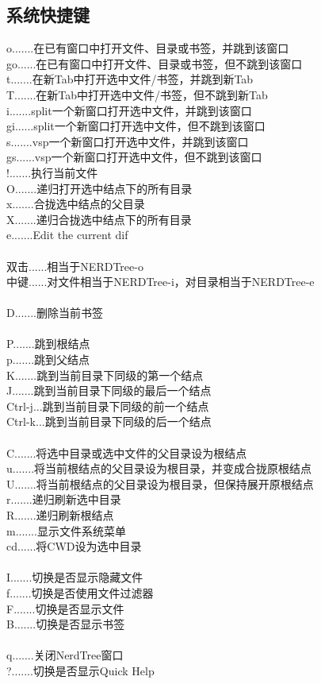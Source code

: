 \subsection{系统快捷键}
o.......在已有窗口中打开文件、目录或书签，并跳到该窗口   \\
go......在已有窗口中打开文件、目录或书签，但不跳到该窗口 \\
t.......在新Tab中打开选中文件/书签，并跳到新Tab          \\
T.......在新Tab中打开选中文件/书签，但不跳到新Tab        \\
i.......split一个新窗口打开选中文件，并跳到该窗口        \\
gi......split一个新窗口打开选中文件，但不跳到该窗口      \\
s.......vsp一个新窗口打开选中文件，并跳到该窗口          \\
gs......vsp一个新窗口打开选中文件，但不跳到该窗口        \\
!.......执行当前文件                                     \\
O.......递归打开选中结点下的所有目录                     \\
x.......合拢选中结点的父目录                             \\
X.......递归合拢选中结点下的所有目录                     \\
e.......Edit the current dif                             \\
\\
双击......相当于NERDTree-o\\
中键......对文件相当于NERDTree-i，对目录相当于NERDTree-e\\
\\
D.......删除当前书签\\
       \\
P.......跳到根结点\\
p.......跳到父结点\\
K.......跳到当前目录下同级的第一个结点\\
J.......跳到当前目录下同级的最后一个结点\\
Ctrl-j...跳到当前目录下同级的前一个结点\\
Ctrl-k...跳到当前目录下同级的后一个结点\\
       \\
C.......将选中目录或选中文件的父目录设为根结点\\
u.......将当前根结点的父目录设为根目录，并变成合拢原根结点\\
U.......将当前根结点的父目录设为根目录，但保持展开原根结点\\
r.......递归刷新选中目录\\
R.......递归刷新根结点\\
m.......显示文件系统菜单\\
cd......将CWD设为选中目录\\
       \\
I.......切换是否显示隐藏文件\\
f.......切换是否使用文件过滤器\\
F.......切换是否显示文件\\
B.......切换是否显示书签\\
       \\
q.......关闭NerdTree窗口\\
?.......切换是否显示Quick Help\\
\\
\newpage
